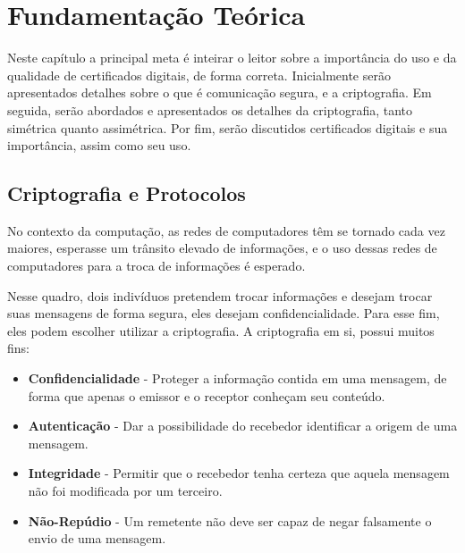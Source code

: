 


\chapter[Fundamentação Teórica]{Fundamentação Teórica}

	Neste capítulo a principal meta é inteirar o leitor sobre a importância do uso e da qualidade de certificados digitais, de forma correta. Inicialmente serão apresentados detalhes sobre o que é comunicação segura, e a criptografia. Em seguida, serão abordados e apresentados os detalhes da criptografia, tanto simétrica quanto assimétrica. Por fim, serão discutidos certificados digitais e sua importância, assim como seu uso.

\section[Criptografia e Protocolos]{Criptografia e Protocolos}
	No contexto da computação, as redes de computadores têm se tornado cada vez maiores, esperasse um trânsito elevado de informações, e o uso dessas redes de computadores para a troca de informações é esperado. 
	
	Nesse quadro, dois indivíduos pretendem trocar informações e desejam trocar suas mensagens de forma segura, eles desejam confidencialidade. Para esse fim, eles podem escolher utilizar a criptografia. A criptografia em si, possui muitos fins:

	\begin{itemize}
		\item \textbf{Confidencialidade} - Proteger a informação contida em uma mensagem, de forma que apenas o emissor e o receptor conheçam seu conteúdo.
		\item \textbf{Autenticação} - Dar a possibilidade do recebedor identificar a origem de uma mensagem.
		\item \textbf{Integridade} - Permitir que o recebedor tenha certeza que aquela mensagem não foi modificada por um terceiro.
		\item \textbf{Não-Repúdio} - Um remetente não deve ser capaz de negar falsamente o envio de uma mensagem.
	\end{itemize}

